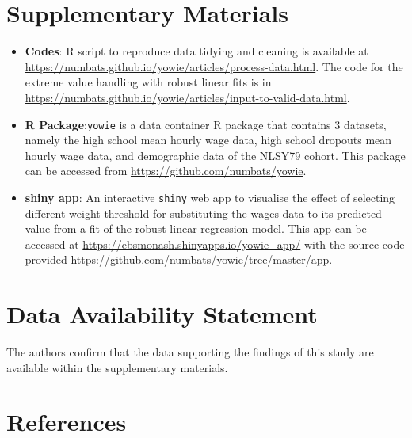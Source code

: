 \documentclass[12pt]{article}
\begin{document}
\hypertarget{supplementary-materials}{%
\section{Supplementary Materials}\label{supplementary-materials}}

\begin{itemize}
\item
  \textbf{Codes}: R script to reproduce data tidying and cleaning is available at \url{https://numbats.github.io/yowie/articles/process-data.html}. The code for the extreme value handling with robust linear fits is in \url{https://numbats.github.io/yowie/articles/input-to-valid-data.html}.
\item
  \textbf{R Package}:\texttt{yowie} is a data container R package that contains 3 datasets, namely the high school mean hourly wage data, high school dropouts mean hourly wage data, and demographic data of the NLSY79 cohort. This package can be accessed from \url{https://github.com/numbats/yowie}.
\item
  \textbf{shiny app}: An interactive \texttt{shiny} web app to visualise the effect of selecting different weight threshold for substituting the wages data to its predicted value from a fit of the robust linear regression model. This app can be accessed at \url{https://ebsmonash.shinyapps.io/yowie_app/} with the source code provided \url{https://github.com/numbats/yowie/tree/master/app}.
\end{itemize}

\hypertarget{data-availability-statement}{%
\section{Data Availability Statement}\label{data-availability-statement}}

The authors confirm that the data supporting the findings of this study are available within the supplementary materials.

\hypertarget{references}{%
\section*{References}\label{references}}
\end{document}
